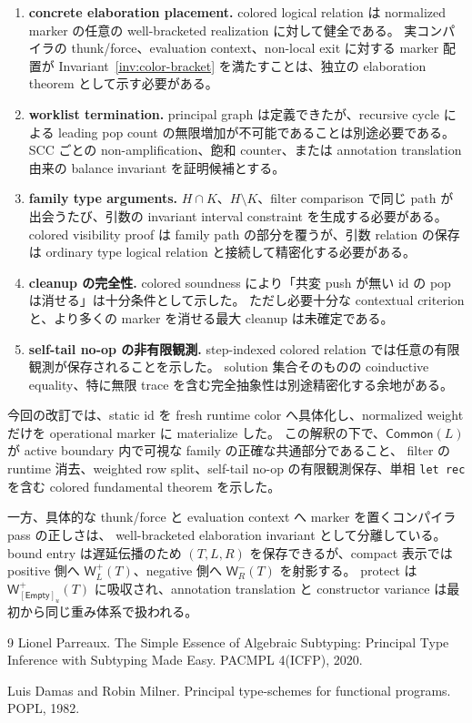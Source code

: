 \documentclass[uplatex,dvipdfmx,a4paper,10.5pt]{jsarticle}
\theoremstyle{jpplain}
\newcommand{\Empty}{\mathsf{Empty}}
\newcommand{\Common}{\mathsf{Common}}
\newcommand{\PWeight}[2]{\mathsf{W}^{+}_{#1}(#2)}
\newcommand{\NWeight}[2]{\mathsf{W}^{-}_{#1}(#2)}
\newcommand{\takeop}[2]{[#1]_{#2}}
\begin{document}
\begin{enumerate}
  \item \textbf{concrete elaboration placement.}
  colored logical relation は normalized marker の任意の well-bracketed realization に対して健全である。
  実コンパイラの thunk/force、evaluation context、non-local exit に対する marker 配置が
  Invariant~\ref{inv:color-bracket} を満たすことは、独立の elaboration theorem として示す必要がある。
  \item \textbf{worklist termination.}
  principal graph は定義できたが、recursive cycle による leading pop count の無限増加が不可能であることは別途必要である。
  SCC ごとの non-amplification、飽和 counter、または annotation translation 由来の balance invariant を証明候補とする。
  \item \textbf{family type arguments.}
  $H\cap K$、$H\setminus K$、filter comparison で同じ path が出会うたび、引数の invariant interval constraint を生成する必要がある。
  colored visibility proof は family path の部分を覆うが、引数 relation の保存は ordinary type logical relation と接続して精密化する必要がある。
  \item \textbf{cleanup の完全性.}
  colored soundness により「共変 push が無い id の pop は消せる」は十分条件として示した。
  ただし必要十分な contextual criterion と、より多くの marker を消せる最大 cleanup は未確定である。
  \item \textbf{self-tail no-op の非有限観測.}
  step-indexed colored relation では任意の有限観測が保存されることを示した。
  solution 集合そのものの coinductive equality、特に無限 trace を含む完全抽象性は別途精密化する余地がある。
\end{enumerate}

\begin{statusbox}
今回の改訂では、static id を fresh runtime color へ具体化し、normalized weight だけを operational marker に materialize した。
この解釈の下で、$\Common(L)$ が active boundary 内で可視な family の正確な共通部分であること、
filter の runtime 消去、weighted row split、self-tail no-op の有限観測保存、単相 \texttt{let rec} を含む
colored fundamental theorem を示した。

一方、具体的な thunk/force と evaluation context へ marker を置くコンパイラ pass の正しさは、
well-bracketed elaboration invariant として分離している。
bound entry は遅延伝播のため $(T,L,R)$ を保存できるが、compact 表示では
positive 側へ $\PWeight{L}{T}$、negative 側へ $\NWeight{R}{T}$ を射影する。
protect は $\PWeight{\takeop{\Empty}{u}}{T}$ に吸収され、annotation translation と constructor variance は最初から同じ重み体系で扱われる。
\end{statusbox}

\begin{thebibliography}{9}
Lionel Parreaux.
\newblock The Simple Essence of Algebraic Subtyping: Principal Type Inference with Subtyping Made Easy.
\newblock PACMPL 4(ICFP), 2020.

Luis Damas and Robin Milner.
\newblock Principal type-schemes for functional programs.
\newblock POPL, 1982.
\end{thebibliography}
\end{document}
